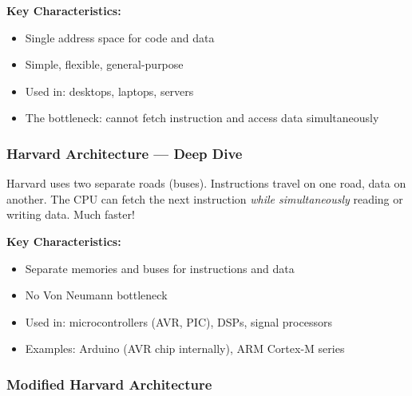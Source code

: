 \documentclass[11pt,a4paper]{article}
\begin{document}
\textbf{Key Characteristics:}
\begin{itemize}[noitemsep]
  \item Single address space for code and data
  \item Simple, flexible, general-purpose
  \item Used in: desktops, laptops, servers
  \item The bottleneck: cannot fetch instruction and access data simultaneously
\end{itemize}

\subsubsection{Harvard Architecture --- Deep Dive}

Harvard uses two separate roads (buses). Instructions travel on one road, data on another. The CPU can fetch the next instruction \textit{while simultaneously} reading or writing data. Much faster!

\begin{center}
\end{center}

\textbf{Key Characteristics:}
\begin{itemize}[noitemsep]
  \item Separate memories and buses for instructions and data
  \item No Von Neumann bottleneck
  \item Used in: microcontrollers (AVR, PIC), DSPs, signal processors
  \item Examples: Arduino (AVR chip internally), ARM Cortex-M series
\end{itemize}

\subsubsection{Modified Harvard Architecture}
\end{document}

